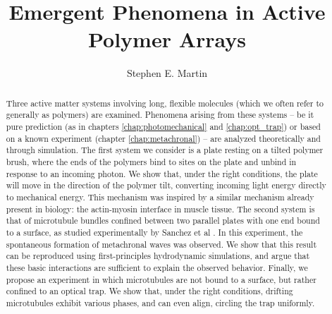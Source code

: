 \documentclass[11pt]{ucthesis}
\begin{document}

\title{Emergent Phenomena in Active Polymer Arrays}
\author{Stephen E. Martin}
\deanlinethree{}

\begin{frontmatter}

\maketitle
\newpage\null\thispagestyle{empty}\newpage
\tableofcontents
\listoffigures

\begin{abstract}
\thispagestyle{plain}

Three active matter systems involving long, flexible molecules (which we often refer to generally as polymers) are examined. Phenomena arising from these systems -- be it pure prediction (as in chapters \ref{chap:photomechanical} and \ref{chap:opt_trap}) or based on a known experiment (chapter \ref{chap:metachronal}) -- are analyzed theoretically and through simulation. The first system we consider is a plate resting on a tilted polymer brush, where the ends of the polymers bind to sites on the plate and unbind in response to an incoming photon. We show that, under the right conditions, the plate will move in the direction of the polymer tilt, converting incoming light energy directly to mechanical energy. This mechanism was inspired by a similar mechanism already present in biology: the actin-myosin interface in muscle tissue. The second system is that of microtubule bundles confined between two parallel plates with one end bound to a surface, as studied experimentally by Sanchez et al \cite{Sanchez2011}. In this experiment, the spontaneous formation of metachronal waves was observed. We show that this result can be reproduced using first-principles hydrodynamic simulations, and argue that these basic interactions are sufficient to explain the observed behavior. Finally, we propose an experiment in which microtubules are not bound to a surface, but rather confined to an optical trap. We show that, under the right conditions, drifting microtubules exhibit various phases, and can even align, circling the trap uniformly.\vspace{-10em}
\end{abstract}


\end{frontmatter}
\end{document}
